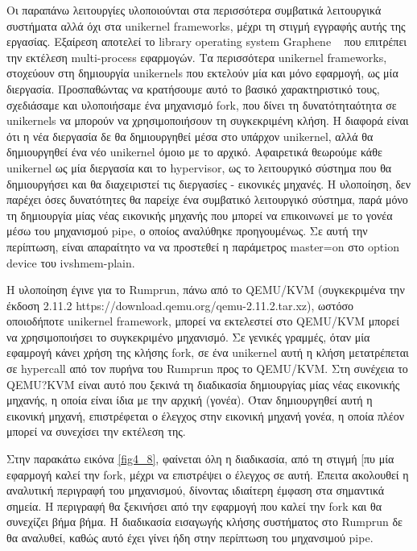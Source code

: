 Οι παραπάνω λειτουργίες υλοποιούνται στα περισσότερα συμβατικά λειτουργικά
συστήματα αλλά όχι στα unikernel frameworks, μέχρι τη στιγμή εγγραφής αυτής της
εργασίας. Εξαίρεση αποτελεί το library operating system Graphene
~\cite{tsai2014cooperation} που επιτρέπει την εκτέλεση multi-process εφαρμογών.
Τα περισσότερα unikernel frameworks, στοχεύουν στη δημιουργία unikernels που
εκτελούν μία και μόνο εφαρμογή, ως μία διεργασία. Προσπαθώντας να κρατήσουμε
αυτό το βασικό χαρακτηριστικό τους, σχεδιάσαμε και υλοποιήσαμε ένα μηχανισμό
fork, που δίνει τη δυνατότηταότητα σε unikernels να μπορούν να χρησιμοποιήσουν
τη συγκεκριμένη κλήση. Η διαφορά είναι ότι η νέα διεργασία δε θα δημιουργηθεί
μέσα στο υπάρχον unikernel, αλλά θα δημιουργηθεί ένα νέο unikernel όμοιο με το
αρχικό. Αφαιρετικά θεωρούμε κάθε unikernel ως μία διεργασία και το hypervisor,
ως το λειτουργικό σύστημα που θα δημιουργήσει και θα διαχειριστεί τις διεργασίες
- εικονικές μηχανές. Η υλοποίηση, δεν παρέχει όσες δυνατότητες θα παρείχε ένα
συμβατικό λειτουργικό σύστημα, παρά μόνο τη δημιουργία μίας νέας εικονικής
μηχανής που μπορεί να επικοινωνεί με το γονέα μέσω του μηχανισμού pipe, ο οποίος 
αναλύθηκε προηγουμένως. Σε αυτή την περίπτωση, είναι απαραίτητο να να προστεθεί
η παράμετρος master=on στο option device του ivshmem-plain.

Η υλοποίηση έγινε για το Rumprun, πάνω από το QEMU/KVM (συγκεκριμένα την έκδοση
2.11.2 https://download.qemu.org/qemu-2.11.2.tar.xz), ωστόσο οποιοδήποτε
unikernel framework, μπορεί να εκτελεστεί στο QEMU/KVM μπορεί να χρησιμοποιήσει
το συγκεκριμένο μηχανισμό. Σε γενικές γραμμές, όταν μία εφαμρογή κάνει χρήση της
κλήσης fork, σε ένα unikernel αυτή η κλήση μετατρέπεται σε hypercall από τον
πυρήνα του Rumprun προς το QEMU/KVM. Στη συνέχεια το QEMU?KVM είναι αυτό που
ξεκινά τη διαδικασία δημιουργίας μίας νέας εικονικής μηχανής, η οποία είναι ίδια
με την αρχική (γονέα). Όταν δημιουργηθεί αυτή η εικονική μηχανή, επιστρέφεται ο
έλεγχος στην εικονική μηχανή γονέα, η οποία πλέον μπορεί να συνεχίσει την
εκτέλεση της. 

Στην παρακάτω εικόνα \ref{fig4_8}, φαίνεται όλη η διαδικασία, από τη στιγμή [πυ
μία εφαρμογή καλεί την fork, μέχρι να επιστρέψει ο έλεγχος σε αυτή. Έπειτα
ακολουθεί η αναλυτική περιγραφή του μηχανισμού, δίνοντας ιδιαίτερη έμφαση στα
σημαντικά σημεία. Η περιγραφή θα ξεκινήσει από την εφαρμογή που καλεί την fork
και θα συνεχίζει βήμα βήμα. Η διαδικασία εισαγωγής κλήσης συστήματος στο Rumprun
δε θα αναλυθεί, καθώς αυτό έχει γίνει ήδη στην περίπτωση του μηχανσιμού pipe.

